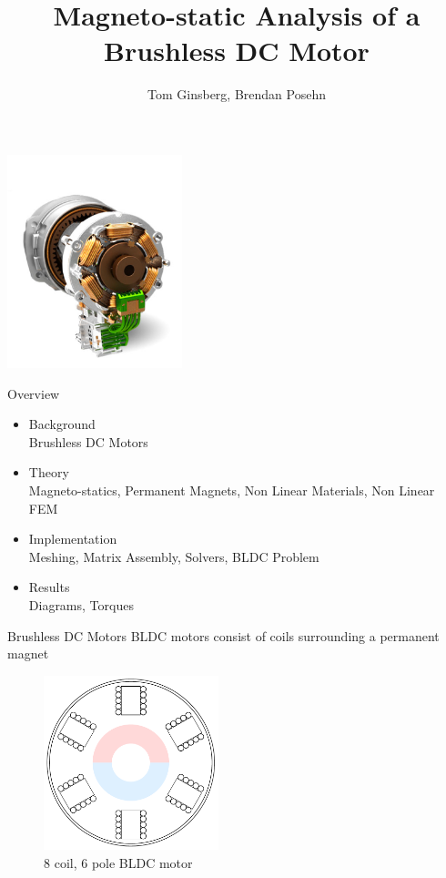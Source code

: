 \documentclass{beamer}
\title[Your Short Title]{Magneto-static Analysis of a Brushless DC Motor}
\author{\small Tom Ginsberg, Brendan Posehn}
\date{}
\begin{document}
    \begin{frame}
        \vspace{0.5cm}
        \titlepage
        \vspace{-1.5cm}
        \begin{center}
            \includegraphics[width=2in]{render.png}
        \end{center}
    \end{frame}

    \begin{frame}{Overview}
        \begin{itemize}
            \item {\large Background}\\
            Brushless DC Motors
            \item {\large Theory}\\
            Magneto-statics, Permanent Magnets, Non Linear Materials, Non Linear FEM
            \item {\large Implementation}\\
            Meshing, Matrix Assembly, Solvers, BLDC Problem
            \item {\large Results}\\
            Diagrams, Torques
        \end{itemize}

    \end{frame}

    \begin{frame}{Brushless DC Motors}
        BLDC motors consist of coils surrounding a permanent magnet\newline
        \begin{figure}
            \center
            \includegraphics[width=2in]{motor_simple.pdf}
            \caption*{8 coil, 6 pole BLDC motor}
        \end{figure}
    \end{frame}
\end{document}
